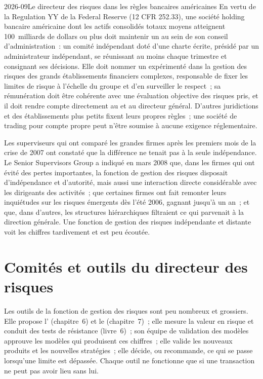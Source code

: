 \begin{dated}{2026-09}{Le directeur des risques dans les règles bancaires américaines}\label{dat:fm:the-risk-management-function:rules}
En vertu de la Regulation YY de la Federal Reserve (12 CFR 252.33), une société holding bancaire américaine dont les actifs consolidés totaux moyens atteignent 100~milliards de dollars ou plus
doit maintenir un  au sein de son conseil d'administration~: un comité indépendant doté d'une charte écrite, présidé par un administrateur indépendant, se réunissant au moins
chaque trimestre et consignant ses décisions. Elle doit nommer un  expérimenté dans la gestion des risques des grands établissements financiers complexes, responsable
de fixer les limites de risque à l'échelle du groupe et d'en surveiller le respect~; sa rémunération doit être cohérente avec une évaluation objective des
risques pris, et il doit rendre compte directement au  et au directeur général. D'autres juridictions et des établissements plus petits fixent leurs propres
règles~; une société de trading pour compte propre peut n'être soumise à aucune exigence réglementaire.
\end{dated}

Les superviseurs qui ont comparé les grandes firmes après les premiers mois de la crise de 2007 ont constaté que la différence ne tenait pas à la seule indépendance. Le Senior
Supervisors Group a indiqué en mars 2008 que, dans les firmes qui ont évité des pertes importantes, la fonction de gestion des risques disposait d'indépendance et d'autorité, mais aussi
une interaction directe considérable avec les dirigeants des activités~; que certaines firmes ont fait remonter leurs inquiétudes sur les risques émergents dès l'été
2006, gagnant jusqu'à un an~; et que, dans d'autres, les structures hiérarchiques filtraient ce qui parvenait à la direction générale. Une fonction de gestion des risques indépendante
et distante voit les chiffres tardivement et est peu écoutée.

\section{Comités et outils du directeur des risques}

Les outils de la fonction de gestion des risques sont peu nombreux et grossiers. Elle propose l' (chapitre~6) et le  (chapitre~7)~; elle mesure la valeur en
risque et conduit des tests de résistance (livre~6)~; son équipe de validation des modèles approuve les modèles qui produisent ces chiffres~; elle valide les nouveaux produits et les nouvelles
stratégies~; elle décide, ou recommande, ce qui se passe lorsqu'une limite est dépassée. Chaque outil ne fonctionne que si une transaction ne peut pas avoir lieu sans lui.

